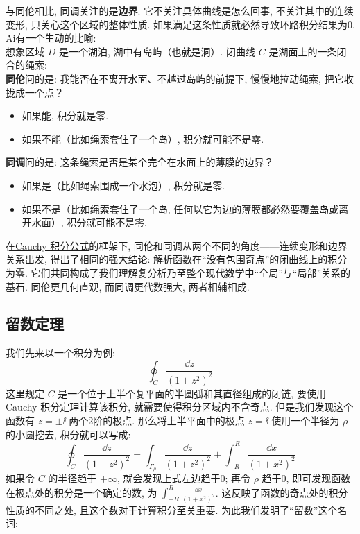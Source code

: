         与同伦相比, 同调关注的是\textbf{边界}. 它不关注具体曲线是怎么回事, 不关注其中的连续变形, 只关心这个区域的整体性质. 如果满足这条性质就必然导致环路积分结果为0.\\
        Ai有一个生动的比喻:\\
        想象区域  \(D\)  是一个湖泊, 湖中有岛屿（也就是洞）. 闭曲线  \(C\)  是湖面上的一条闭合的绳索:\\
        \textbf{同伦}问的是: 我能否在不离开水面、不越过岛屿的前提下, 慢慢地拉动绳索, 把它收拢成一个点？

        \begin{itemize}
            \item 如果能, 积分就是零. 
            \item 如果不能（比如绳索套住了一个岛）, 积分就可能不是零. 
        \end{itemize}

        \textbf{同调}问的是: 这条绳索是否是某个完全在水面上的薄膜的边界？

        \begin{itemize}
            \item 如果是（比如绳索围成一个水泡）, 积分就是零. 
            \item 如果不是（比如绳索套住了一个岛, 任何以它为边的薄膜都必然要覆盖岛或离开水面）, 积分就可能不是零. 
        \end{itemize}

        在\hyperref[thm:Cauchy-Integral]{Cauchy 积分公式}的框架下, 同伦和同调从两个不同的角度——连续变形和边界关系出发, 得出了相同的强大结论: 解析函数在“没有包围奇点”的闭曲线上的积分为零. 它们共同构成了我们理解复分析乃至整个现代数学中“全局”与“局部”关系的基石. 同伦更几何直观, 而同调更代数强大, 两者相辅相成. 

    \subsection{留数定理}

        我们先来以一个积分为例: 
        \[\oint_C \frac{\dd{z}}{(1+z^2)^2}\]
        这里规定 \(C\) 是一个位于上半个复平面的半圆弧和其直径组成的闭链, 要使用Cauchy 积分定理计算该积分, 就需要使得积分区域内不含奇点. 但是我们发现这个函数有 \(z=\pm\ii\) 两个2阶的极点. 那么将上半平面中的极点 \(z=\ii\) 使用一个半径为 \(\rho\) 的小圆挖去, 积分就可以写成: 
        \[\oint_{C} \frac{\dd{z}}{(1+z^2)^2}=\int_{\Gamma_\rho}\frac{\dd{z}}{(1+z^2)^2}+\int_{-R}^R\frac{\dd{x}}{(1+x^2)^2}\]
        如果令 \(C\) 的半径趋于 \(+\infty\), 就会发现上式左边趋于0; 再令 \(\rho\) 趋于0, 即可发现函数在极点处的积分是一个确定的数, 为 \(\int_{-R}^R\frac{\dd{x}}{(1+x^2)^2}\). 这反映了函数的奇点处的积分性质的不同之处, 且这个数对于计算积分至关重要. 为此我们发明了“留数”这个名词: 

